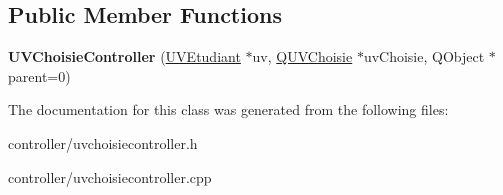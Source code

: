 \subsection*{Public Member Functions}
\begin{DoxyCompactItemize}
\item 
\hypertarget{classUVChoisieController_a110b8137e2dce05f0b2575f0f03c1598}{{\bfseries U\+V\+Choisie\+Controller} (\hyperlink{classUVEtudiant}{U\+V\+Etudiant} $\ast$uv, \hyperlink{classQUVChoisie}{Q\+U\+V\+Choisie} $\ast$uv\+Choisie, Q\+Object $\ast$parent=0)}\label{classUVChoisieController_a110b8137e2dce05f0b2575f0f03c1598}

\end{DoxyCompactItemize}


The documentation for this class was generated from the following files\+:\begin{DoxyCompactItemize}
\item 
controller/uvchoisiecontroller.\+h\item 
controller/uvchoisiecontroller.\+cpp\end{DoxyCompactItemize}
